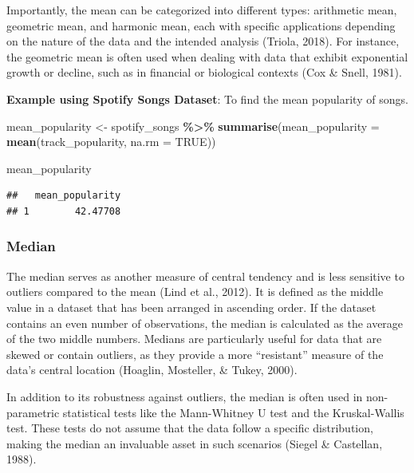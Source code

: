 \documentclass[
  b5paper]{book}
\newenvironment{Shaded}{\begin{snugshade}}{\end{snugshade}}
\newcommand{\AttributeTok}[1]{\textcolor[rgb]{0.13,0.29,0.53}{#1}}
\newcommand{\ConstantTok}[1]{\textcolor[rgb]{0.56,0.35,0.01}{#1}}
\newcommand{\FunctionTok}[1]{\textcolor[rgb]{0.13,0.29,0.53}{\textbf{#1}}}
\newcommand{\NormalTok}[1]{#1}
\newcommand{\OtherTok}[1]{\textcolor[rgb]{0.56,0.35,0.01}{#1}}
\newcommand{\SpecialCharTok}[1]{\textcolor[rgb]{0.81,0.36,0.00}{\textbf{#1}}}
\begin{document}
Importantly, the mean can be categorized into different types: arithmetic mean, geometric mean, and harmonic mean, each with specific applications depending on the nature of the data and the intended analysis (Triola, 2018). For instance, the geometric mean is often used when dealing with data that exhibit exponential growth or decline, such as in financial or biological contexts (Cox \& Snell, 1981).

\textbf{Example using Spotify Songs Dataset}: To find the mean popularity of songs.

\begin{Shaded}
\begin{Highlighting}[]
\NormalTok{mean\_popularity }\OtherTok{\textless{}{-}}\NormalTok{ spotify\_songs }\SpecialCharTok{\%\textgreater{}\%} 
  \FunctionTok{summarise}\NormalTok{(}\AttributeTok{mean\_popularity =} \FunctionTok{mean}\NormalTok{(track\_popularity, }\AttributeTok{na.rm =} \ConstantTok{TRUE}\NormalTok{))}

\NormalTok{mean\_popularity}
\end{Highlighting}
\end{Shaded}

\begin{verbatim}
##   mean_popularity
## 1        42.47708
\end{verbatim}

\hypertarget{median}{%
\subsubsection*{Median}\label{median}}

The median serves as another measure of central tendency and is less sensitive to outliers compared to the mean (Lind et al., 2012). It is defined as the middle value in a dataset that has been arranged in ascending order. If the dataset contains an even number of observations, the median is calculated as the average of the two middle numbers. Medians are particularly useful for data that are skewed or contain outliers, as they provide a more ``resistant'' measure of the data's central location (Hoaglin, Mosteller, \& Tukey, 2000).

In addition to its robustness against outliers, the median is often used in non-parametric statistical tests like the Mann-Whitney U test and the Kruskal-Wallis test. These tests do not assume that the data follow a specific distribution, making the median an invaluable asset in such scenarios (Siegel \& Castellan, 1988).
\end{document}
